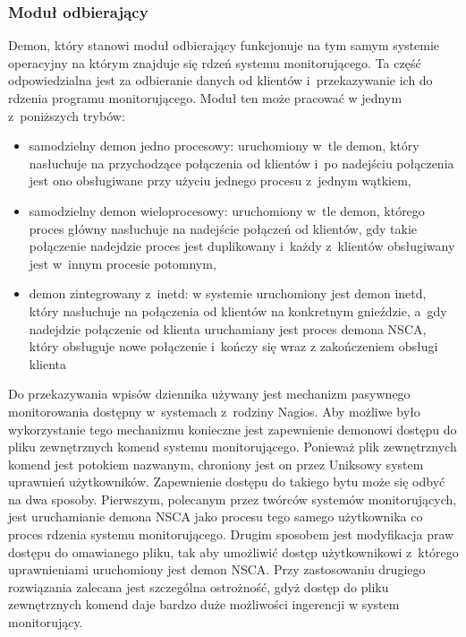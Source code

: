 \subsubsection[Moduł odbierający][Moduł odbierający]{Moduł odbierający}

Demon, który stanowi moduł odbierający funkcjonuje na tym samym
systemie operacyjny na którym znajduje się rdzeń systemu
monitorującego. Ta część odpowiedzialna jest za odbieranie danych od
klientów i~przekazywanie ich do rdzenia programu monitorującego. Moduł
ten może pracować w jednym z~poniższych trybów:

\begin{itemize}
\item samodzielny demon jedno procesowy: uruchomiony w~tle demon, który
  nasłuchuje na przychodzące połączenia od klientów i~po nadejściu
  połączenia jest ono obsługiwane przy użyciu jednego procesu z~jednym
  wątkiem,
\item samodzielny demon wieloprocesowy: uruchomiony w~tle demon,
  którego proces główny nasłuchuje na nadejście połączeń od klientów,
  gdy takie połączenie nadejdzie proces jest duplikowany i~każdy
  z~klientów obsługiwany jest w~innym procesie potomnym,
\item demon zintegrowany z~inetd: w systemie uruchomiony jest demon
  inetd, który nasłuchuje na połączenia od klientów na konkretnym
  gnieździe, a~gdy nadejdzie połączenie od klienta uruchamiany jest
  proces demona NSCA, który obsługuje nowe połączenie i~kończy się
  wraz z zakończeniem obsługi klienta
\end{itemize}

Do przekazywania wpisów dziennika używany jest mechanizm pasywnego
monitorowania dostępny w~systemach z~rodziny Nagios. Aby możliwe było
wykorzystanie tego mechanizmu konieczne jest zapewnienie demonowi
dostępu do pliku zewnętrznych komend systemu monitorującego. Ponieważ
plik zewnętrznych komend jest potokiem nazwanym, chroniony jest on
przez Uniksowy system uprawnień użytkowników. Zapewnienie dostępu do
takiego bytu może się odbyć na dwa sposoby. Pierwszym, polecanym przez
twórców systemów monitorujących, jest uruchamianie demona NSCA jako
procesu tego samego użytkownika co proces rdzenia systemu
monitorującego. Drugim sposobem jest modyfikacja praw dostępu do
omawianego pliku, tak aby umożliwić dostęp użytkownikowi z~którego
uprawnieniami uruchomiony jest demon NSCA. Przy zastosowaniu drugiego
rozwiązania zalecana jest szczególna ostrożność, gdyż dostęp do pliku
zewnętrznych komend daje bardzo duże możliwości ingerencji w system
monitorujący.

